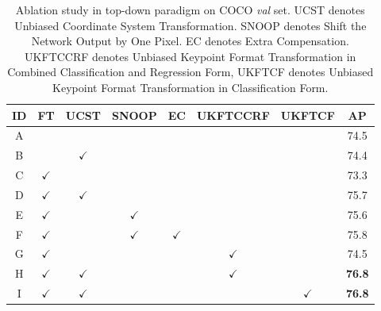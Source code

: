 \documentclass[10pt,journal,compsoc]{IEEEtran}
\begin{document}
\begin{table}[t]
\footnotesize
\caption{Ablation study in top-down paradigm on COCO \textit{val} set. UCST denotes Unbiased Coordinate System Transformation. SNOOP denotes Shift the Network Output by One Pixel. EC denotes Extra Compensation. UKFTCCRF denotes Unbiased Keypoint Format Transformation in Combined Classification and Regression Form, UKFTCF denotes Unbiased Keypoint Format Transformation in Classification Form.}
\begin{center}
\begin{tabular}{c|c|c|c|c|c|c|c}

\hline
ID      &FT             &UCST           &SNOOP          &EC             &UKFTCCRF       &UKFTCF        &AP   \\
\hline
A       &               &               &               &               &               &               &74.5 \\
B       &               &$\checkmark$   &               &               &               &               &74.4 \\
C       &$\checkmark$   &               &               &               &               &               &73.3 \\
D       &$\checkmark$   &$\checkmark$   &               &               &               &               &75.7 \\
E       &$\checkmark$   &               &$\checkmark$   &               &               &               &75.6 \\
F       &$\checkmark$   &               &$\checkmark$   &$\checkmark$   &               &               &75.8 \\
\hline
G       &$\checkmark$   &               &               &               &$\checkmark$   &               &74.5 \\
H       &$\checkmark$   &$\checkmark$   &               &               &$\checkmark$   &               &\textbf{76.8} \\
I       &$\checkmark$   &$\checkmark$   &               &               &               &$\checkmark$   &\textbf{76.8} \\
\hline
\end{tabular}
\end{center}
\label{tab:ablation_top_down}
\end{table}
\end{document}

